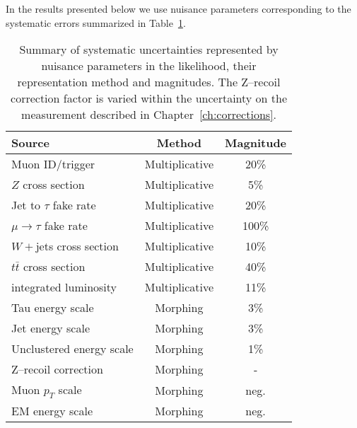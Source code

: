 In the results presented below we use nuisance parameters corresponding
to the systematic errors summarized in Table~\ref{tab-sys}.
\begin{table}
  \begin{center}
    \begin{tabular}{|l|c|c|} \hline
  Source                 &       Method      &   Magnitude  \\ \hline
Muon ID/trigger          &  Multiplicative   &    20\%      \\
$Z$ cross section        &  Multiplicative   &     5\%      \\
Jet to $\tau$ fake rate  &  Multiplicative   &    20\%      \\
$\mu\to\tau$ fake rate   &  Multiplicative   &   100\%      \\
$W+$jets cross section   &  Multiplicative   &    10\%      \\
$t\bar{t}$ cross section &  Multiplicative   &    40\%      \\
integrated luminosity    &  Multiplicative   &    11\%      \\
Tau energy scale         &  Morphing         &     3\%      \\
Jet energy scale      &  Morphing         &     3\%      \\
Unclustered energy scale      &  Morphing         &     1\%      \\
Z--recoil correction      &  Morphing         &     -      \\
Muon $p_T$ scale         &  Morphing         &   neg.       \\
EM energy scale          &  Morphing         &   neg.       \\ \hline
    \end{tabular}
   \end{center}
  \caption[Summary of systematic uncertainties]{Summary of systematic
  uncertainties represented by nuisance parameters in the likelihood, their
  representation method and magnitudes.  The Z--recoil correction factor is
  varied within the uncertainty on the measurement described in
  Chapter~\ref{ch:corrections}. \label{tab-sys}}
\end{table}


\ifx\master\undefined\fi
